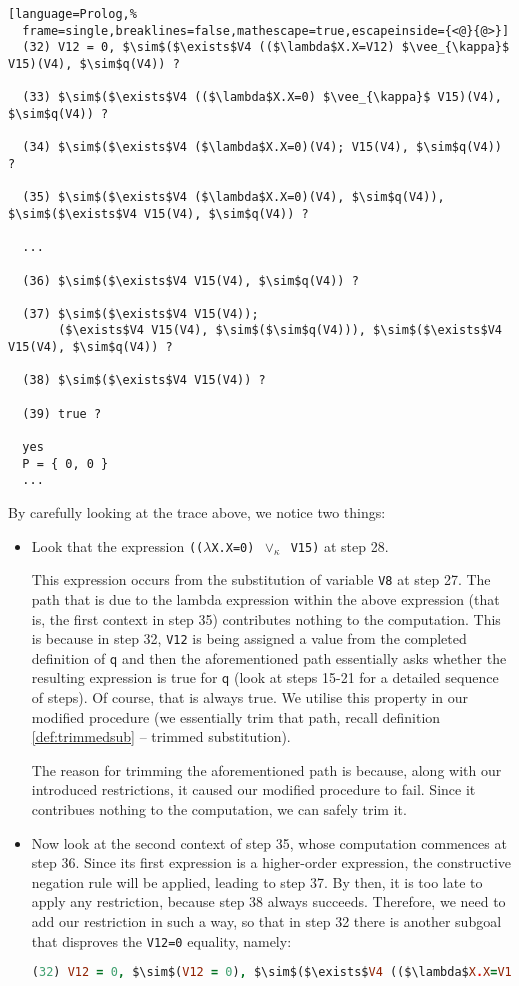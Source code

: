 \documentclass[inscr,ack,preface]{dithesis}
\theoremstyle{definition}
\newcommand{\msf}[1]{$\mathsf{#1}$}
\begin{document}
\begin{lstlisting}[language=Prolog,%
  frame=single,breaklines=false,mathescape=true,escapeinside={<@}{@>}]
  (32) V12 = 0, $\sim$($\exists$V4 (($\lambda$X.X=V12) $\vee_{\kappa}$ V15)(V4), $\sim$q(V4)) ?

  (33) $\sim$($\exists$V4 (($\lambda$X.X=0) $\vee_{\kappa}$ V15)(V4), $\sim$q(V4)) ?

  (34) $\sim$($\exists$V4 ($\lambda$X.X=0)(V4); V15(V4), $\sim$q(V4)) ?

  (35) $\sim$($\exists$V4 ($\lambda$X.X=0)(V4), $\sim$q(V4)), $\sim$($\exists$V4 V15(V4), $\sim$q(V4)) ?

  ...

  (36) $\sim$($\exists$V4 V15(V4), $\sim$q(V4)) ?

  (37) $\sim$($\exists$V4 V15(V4));
       ($\exists$V4 V15(V4), $\sim$($\sim$q(V4))), $\sim$($\exists$V4 V15(V4), $\sim$q(V4)) ?

  (38) $\sim$($\exists$V4 V15(V4)) ?

  (39) true ?

  yes
  P = { 0, 0 }
  ...
\end{lstlisting}

By carefully looking at the trace above, we notice two things:
\begin{itemize}
  \item Look that the expression \texttt{(($\lambda$X.X=0) $\vee_{\kappa}$ V15)} at step 28.

  This expression occurs from the substitution of variable \texttt{V8} at step 27. The path that is due to the lambda expression within the above expression (that is, the first context in step 35) contributes nothing to the computation. This is because in step 32, \texttt{V12} is being assigned a value from the completed definition of \msf{q} and then the aforementioned path essentially asks whether the resulting expression is true for \msf{q} (look at steps 15-21 for a detailed sequence of steps). Of course, that is always true. We utilise this property in our modified procedure (we essentially trim that path, recall definition \ref{def:trimmedsub} -- trimmed substitution).

  The reason for trimming the aforementioned path is because, along with our introduced restrictions, it caused our modified procedure to fail. Since it contribues nothing to the computation, we can safely trim it.

  \item Now look at the second context of step 35, whose computation commences at step 36. Since its first expression is a higher-order expression, the constructive negation rule will be applied, leading to step 37. By then, it is too late to apply any restriction, because step 38 always succeeds. Therefore, we need to add our restriction in such a way, so that in step 32 there is another subgoal that disproves the \texttt{V12=0} equality, namely:
  \begin{lstlisting}[language=Prolog,%
    frame=single,breaklines=false,mathescape=true]
  (32) V12 = 0, $\sim$(V12 = 0), $\sim$($\exists$V4 (($\lambda$X.X=V12) $\vee_{\kappa}$ V15)(V4), $\sim$q(V4)) ?
  \end{lstlisting}
\end{itemize}
\end{document}
